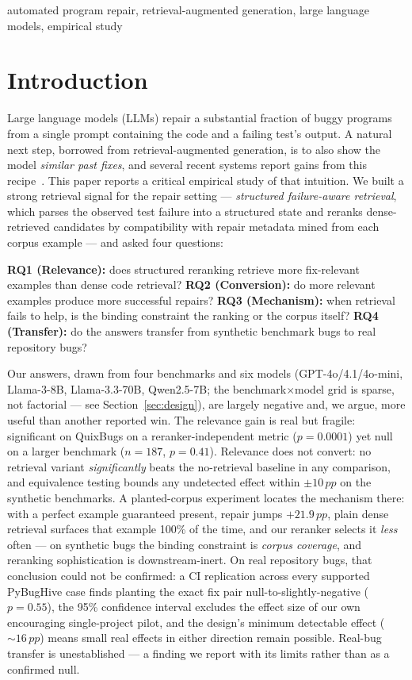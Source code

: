 \documentclass[10pt,conference,a4paper]{IEEEtran}
\newcommand{\pp}{\,pp}
\begin{document}
\begin{IEEEkeywords}
automated program repair, retrieval-augmented generation, large language
models, empirical study
\end{IEEEkeywords}

\section{Introduction}
\label{sec:intro}

Large language models (LLMs) repair a substantial fraction of buggy programs
from a single prompt containing the code and a failing test's output. A
natural next step, borrowed from retrieval-augmented generation, is to also
show the model \emph{similar past fixes}, and several recent systems report
gains from this recipe~\cite{recode,inferfix,rapgen,ragfix}. This paper
reports a critical empirical study of that intuition. We built a strong
retrieval signal for the repair setting --- \emph{structured failure-aware
retrieval}, which parses the observed test failure into a structured state
and reranks dense-retrieved candidates by compatibility with repair metadata
mined from each corpus example --- and asked four questions:

\textbf{RQ1 (Relevance):} does structured reranking retrieve more
fix-relevant examples than dense code retrieval?
\textbf{RQ2 (Conversion):} do more relevant examples produce more successful
repairs?
\textbf{RQ3 (Mechanism):} when retrieval fails to help, is the binding
constraint the ranking or the corpus itself?
\textbf{RQ4 (Transfer):} do the answers transfer from synthetic benchmark
bugs to real repository bugs?

Our answers, drawn from four benchmarks and six models
(GPT-4o/4.1/4o-mini, Llama-3-8B, Llama-3.3-70B, Qwen2.5-7B; the
benchmark$\times$model grid is sparse, not factorial --- see
Section~\ref{sec:design}), are largely negative and, we argue, more useful
than another reported win. The relevance gain is real but fragile:
significant on QuixBugs on a reranker-independent metric ($p{=}0.0001$) yet
null on a larger benchmark ($n{=}187$, $p{=}0.41$). Relevance does not
convert: no retrieval variant \emph{significantly} beats the no-retrieval
baseline in any comparison, and equivalence testing bounds any undetected
effect within $\pm 10\pp$ on the synthetic benchmarks. A planted-corpus
experiment locates the mechanism there: with a perfect example guaranteed
present, repair jumps $+21.9\pp$, plain dense retrieval surfaces that
example 100\% of the time, and our reranker selects it \emph{less} often
--- on synthetic bugs the binding constraint is \emph{corpus coverage},
and reranking sophistication is downstream-inert. On real repository bugs,
that conclusion could not be confirmed: a CI replication across every
supported PyBugHive case finds planting the exact fix pair
null-to-slightly-negative ($p{=}0.55$), the 95\% confidence interval
excludes the effect size of our own encouraging single-project pilot, and
the design's minimum detectable effect (${\sim}16\pp$) means small real
effects in either direction remain possible. Real-bug transfer is
unestablished --- a finding we report with its limits rather than as a
confirmed null.
\end{document}
